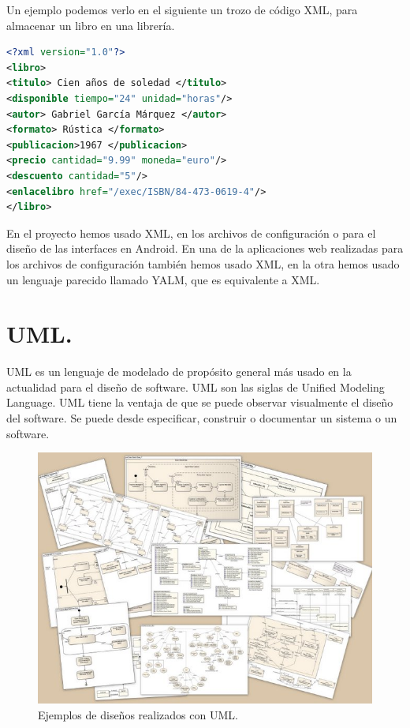 Un ejemplo podemos verlo en el siguiente un trozo de código XML, para almacenar un libro en una librería.

\begin{lstlisting}[language=XML]   
<?xml version="1.0"?>
<libro>
<titulo> Cien años de soledad </titulo>
<disponible tiempo="24" unidad="horas"/>
<autor> Gabriel García Márquez </autor>
<formato> Rústica </formato>
<publicacion>1967 </publicacion>
<precio cantidad="9.99" moneda="euro"/>
<descuento cantidad="5"/>
<enlacelibro href="/exec/ISBN/84-473-0619-4"/>
</libro>
\end{lstlisting}

En el proyecto hemos usado XML, en los archivos de configuración o para el diseño de las interfaces en Android. En una de la aplicaciones web realizadas para los archivos de configuración también hemos usado XML, en la otra hemos usado un lenguaje parecido llamado YALM, que es equivalente a XML.

\section{UML.}

UML es un lenguaje de modelado de propósito general más usado en la actualidad para el diseño de software. UML son las siglas de Unified Modeling Language. UML tiene la ventaja de que se puede observar visualmente el diseño del software. Se puede desde especificar, construir o documentar un sistema o un software.

\begin{figure}
  \centering
    \includegraphics[scale=0.4]{./ConocimientosPrevios/imagenes/UMLDiagrams.jpg}
  \caption{Ejemplos de diseños realizados con UML.}
  \label{fig:UMLDiagrams}
\end{figure}

